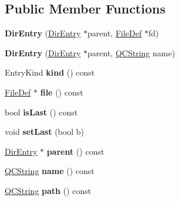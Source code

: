 \subsection*{Public Member Functions}
\begin{DoxyCompactItemize}
\item 
\mbox{\label{class_dir_entry_a04dfc1cc4766297488f75f58ea999ea3}} 
{\bfseries Dir\+Entry} (\mbox{\hyperlink{class_dir_entry}{Dir\+Entry}} $\ast$parent, \mbox{\hyperlink{class_file_def}{File\+Def}} $\ast$fd)
\item 
\mbox{\label{class_dir_entry_aca2fc76af0b968b01bc465bf22da4f19}} 
{\bfseries Dir\+Entry} (\mbox{\hyperlink{class_dir_entry}{Dir\+Entry}} $\ast$parent, \mbox{\hyperlink{class_q_c_string}{Q\+C\+String}} name)
\item 
\mbox{\label{class_dir_entry_ad90535bd922234007d55c5aeecacd4c2}} 
Entry\+Kind {\bfseries kind} () const
\item 
\mbox{\label{class_dir_entry_a066c1571da499e877d59c0817b593d91}} 
\mbox{\hyperlink{class_file_def}{File\+Def}} $\ast$ {\bfseries file} () const
\item 
\mbox{\label{class_dir_entry_af12f7f39e982fa37e9003ebcbf85a234}} 
bool {\bfseries is\+Last} () const
\item 
\mbox{\label{class_dir_entry_afe7c7ba2399a45fff693a00c8390510f}} 
void {\bfseries set\+Last} (bool b)
\item 
\mbox{\label{class_dir_entry_a4fc3f450cb8c57275a576899489233cf}} 
\mbox{\hyperlink{class_dir_entry}{Dir\+Entry}} $\ast$ {\bfseries parent} () const
\item 
\mbox{\label{class_dir_entry_a0c9adc1d60c0c04a270456c3517b6f81}} 
\mbox{\hyperlink{class_q_c_string}{Q\+C\+String}} {\bfseries name} () const
\item 
\mbox{\label{class_dir_entry_a106d84dd4fac3cb3d34959ddaf2c9323}} 
\mbox{\hyperlink{class_q_c_string}{Q\+C\+String}} {\bfseries path} () const
\end{DoxyCompactItemize}
